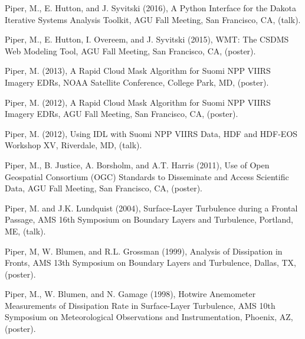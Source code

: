 \documentclass[letterpaper]{resume}
\begin{document}
\begin{enumerate}[{[}1{]}]

  \item Piper, M., E. Hutton, and J. Syvitski (2016), A Python
    Interface for the Dakota Iterative Systems Analysis Toolkit, AGU
    Fall Meeting, San Francisco, CA, (talk).

  \item Piper, M., E. Hutton, I. Overeem, and J. Syvitski (2015),
    {WMT}: The {CSDMS} Web Modeling Tool, AGU Fall Meeting, San
    Francisco, CA, (poster).

  \item Piper, M. (2013), A Rapid Cloud Mask Algorithm for {Suomi}
    {NPP} {VIIRS} {Imagery} {EDRs}, NOAA Satellite Conference, College
    Park, MD, (poster).

  \item Piper, M. (2012), {A Rapid Cloud Mask Algorithm for {Suomi}
    {NPP} {VIIRS} {Imagery} {EDRs}}, AGU Fall Meeting, San Francisco,
    CA, (poster).

  \item Piper, M. (2012), {Using IDL with {Suomi} {NPP} {VIIRS} Data},
    HDF and HDF-EOS Workshop XV, Riverdale, MD, (talk).

  \item Piper, M., B. Justice, A. Borsholm, and A.T. Harris (2011),
    Use of Open Geospatial Consortium (OGC) Standards to Disseminate
    and Access Scientific Data, AGU Fall Meeting, San Francisco, CA,
    (poster).

  \item Piper, M. and J.K. Lundquist (2004), Surface-Layer Turbulence
    during a Frontal Passage, AMS 16th Symposium on Boundary Layers
    and Turbulence, Portland, ME, (talk).


  \item Piper, M, W. Blumen, and R.L. Grossman (1999), Analysis
    of Dissipation in Fronts, AMS 13th Symposium on Boundary Layers
    and Turbulence, Dallas, TX, (poster).

  \item Piper, M., W. Blumen, and N. Gamage (1998), Hotwire
    Anemometer Measurements of Dissipation Rate in Surface-Layer
    Turbulence, AMS 10th Symposium on Meteorological Observations
    and Instrumentation, Phoenix, AZ, (poster).


\end{enumerate}
\end{document}
